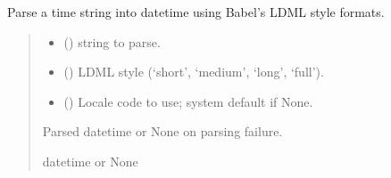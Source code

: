 \documentclass[letterpaper,10pt,english]{sphinxmanual}
\begin{document}

\begin{fulllineitems}
\label{\detokenize{apache_commons_validator_python.util:apache_commons_validator_python.util.datetime_helpers.ldml2strptime}}
\pysigstartsignatures
{}
\pysigstopsignatures
\sphinxAtStartPar
Parse a time string into datetime using Babel’s LDML style formats.
\begin{quote}\begin{description}
\begin{itemize}
\item {} 
\sphinxAtStartPar
{} () \textendash{}  string to parse.

\item {} 
\sphinxAtStartPar
{} () \textendash{} LDML style (‘short’, ‘medium’, ‘long’, ‘full’).

\item {} 
\sphinxAtStartPar
{} (\sphinxstyleliteralemphasis{\sphinxupquote{, }}) \textendash{} Locale code to use; system default if None.

\end{itemize}

\sphinxAtStartPar
Parsed datetime or None on parsing failure.

\sphinxAtStartPar
datetime or None

\end{description}\end{quote}

\end{fulllineitems}
\end{document}

